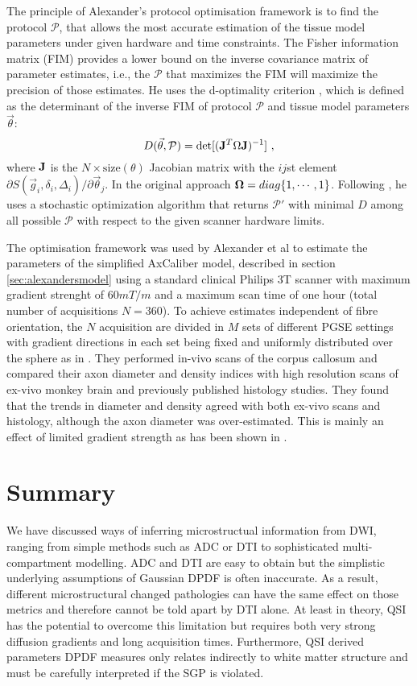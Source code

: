 The principle of Alexander's protocol optimisation framework\cite{alexander08} is to find the protocol $\mathcal{P}$, that allows the most accurate estimation of the tissue model parameters under given hardware and time constraints. The Fisher information matrix (FIM) provides a lower bound on the inverse covariance matrix of parameter estimates, i.e., the $\mathcal{P}$ that maximizes the FIM will maximize the precision of those estimates. He uses the d-optimality criterion \cite{obrien2003}, which is defined as the determinant of the inverse FIM of protocol $\mathcal{P}$ and tissue model parameters $\vec{\theta}$:
\begin{equation}
	D(\vec{\theta},\mathcal{P})=\det[(\mathbf{J}^T\Omega\mathbf{J})^{-1}]~, 
	\label{eq-optimality}
\end{equation}
where $\mathbf{J}$ is the $N\times \mbox{size}(\theta)$ Jacobian matrix with the $ij$st element $\partial S(\vec{g}_i,\delta_i,\Delta_i) / \partial \vec{\theta}_j$. In the original approach $\mathbf{\Omega}=diag\{1,\cdots,1\}$. Following \cite{alexander2008}, he uses a stochastic optimization algorithm \cite{zelinka2000} that returns $\mathcal{P}'$ with minimal $D$ among all possible $\mathcal{P}$ with respect to the given scanner hardware limits.

The optimisation framework was used by Alexander et al \cite{alexander2009} to estimate the parameters of the simplified AxCaliber model, described in section \ref{sec:alexandersmodel} using a standard clinical Philips 3T scanner with maximum gradient strenght of $60mT/m$ and a maximum scan time of one hour (total number of acquisitions $N=360$). To achieve estimates independent of fibre orientation, the $N$ acquisition are divided in $M$ sets of different PGSE settings with gradient directions in each set being fixed and uniformly distributed over the sphere as in \cite{jones00}. They performed in-vivo scans of the corpus callosum and compared their axon diameter and density indices with high resolution scans of ex-vivo monkey brain and previously published histology studies. They found that the trends in diameter and density agreed with both ex-vivo scans and histology, although the axon diameter was over-estimated. This is mainly an effect of limited gradient strength as has been shown in \cite{dyrby2010}.   
\section{Summary}
We have discussed ways of inferring microstructual information from DWI, ranging from simple methods such as ADC or DTI to sophisticated multi-compartment modelling. ADC and DTI are easy to obtain but the simplistic underlying assumptions of Gaussian DPDF is often inaccurate. As a result, different microstructural changed pathologies can have the same effect on those metrics and therefore cannot be told apart by DTI alone. At least in theory, QSI has the potential to overcome this limitation but requires both very strong diffusion gradients and long acquisition times. Furthermore, QSI derived parameters DPDF measures only relates indirectly to white matter structure and must be carefully interpreted if the SGP is violated.


